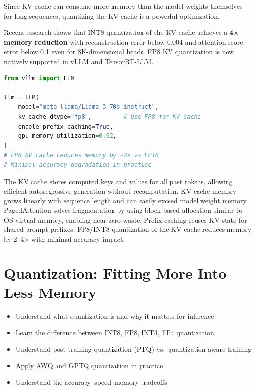 \documentclass[11pt, twoside, openright]{book}
\newenvironment{learningobjectives}
  {\begin{tcolorbox}[enhanced, breakable,
    colback={rgb,255:red,232;green,240;blue,255},
    colframe=NavyBlue, boxrule=1.5pt, arc=4pt,
    title={\bfseries Learning Objectives},
    fonttitle=\bfseries\color{white},
    attach boxed title to top left={yshift=-2mm, xshift=5mm},
    boxed title style={colback=NavyBlue, arc=2pt}]
  \begin{itemize}[leftmargin=1.5em, itemsep=2pt]}
  {\end{itemize}\end{tcolorbox}}
\newenvironment{chapsummary}
  {\begin{tcolorbox}[enhanced, breakable,
    colback={rgb,255:red,245;green,245;blue,225},
    colframe=AccentOrange, boxrule=1.5pt, arc=4pt,
    title={\bfseries Chapter Summary},
    fonttitle=\bfseries\color{white},
    attach boxed title to top left={yshift=-2mm, xshift=5mm},
    boxed title style={colback=AccentOrange, arc=2pt}]}
  {\end{tcolorbox}}
\begin{document}
Since KV cache can consume more memory than the model weights themselves for long
sequences, quantizing the KV cache is a powerful optimization.

Recent research shows that INT8 quantization of the KV cache achieves a
\textbf{4$\times$ memory reduction} with reconstruction error below 0.004 and
attention score error below 0.1 even for 8K-dimensional heads.  FP8 KV
quantization is now natively supported in vLLM and TensorRT-LLM.

\begin{lstlisting}[language=Python, caption={FP8 KV cache quantization in vLLM}]
from vllm import LLM

llm = LLM(
    model="meta-llama/Llama-3-70b-instruct",
    kv_cache_dtype="fp8",         # Use FP8 for KV cache
    enable_prefix_caching=True,
    gpu_memory_utilization=0.92,
)
# FP8 KV cache reduces memory by ~2x vs FP16
# Minimal accuracy degradation in practice
\end{lstlisting}

\begin{chapsummary}
The KV cache stores computed keys and values for all past tokens, allowing
efficient autoregressive generation without recomputation.  KV cache memory
grows linearly with sequence length and can easily exceed model weight memory.
PagedAttention solves fragmentation by using block-based allocation similar to
OS virtual memory, enabling near-zero waste.  Prefix caching reuses KV state
for shared prompt prefixes.  FP8/INT8 quantization of the KV cache reduces
memory by 2--4$\times$ with minimal accuracy impact.
\end{chapsummary}

\chapter{Quantization: Fitting More Into Less Memory}
\label{ch:quantization}

\begin{learningobjectives}
  \item Understand what quantization is and why it matters for inference
  \item Learn the difference between INT8, FP8, INT4, FP4 quantization
  \item Understand post-training quantization (PTQ) vs.\ quantization-aware training
  \item Apply AWQ and GPTQ quantization in practice
  \item Understand the accuracy--speed--memory tradeoffs
\end{learningobjectives}
\end{document}

